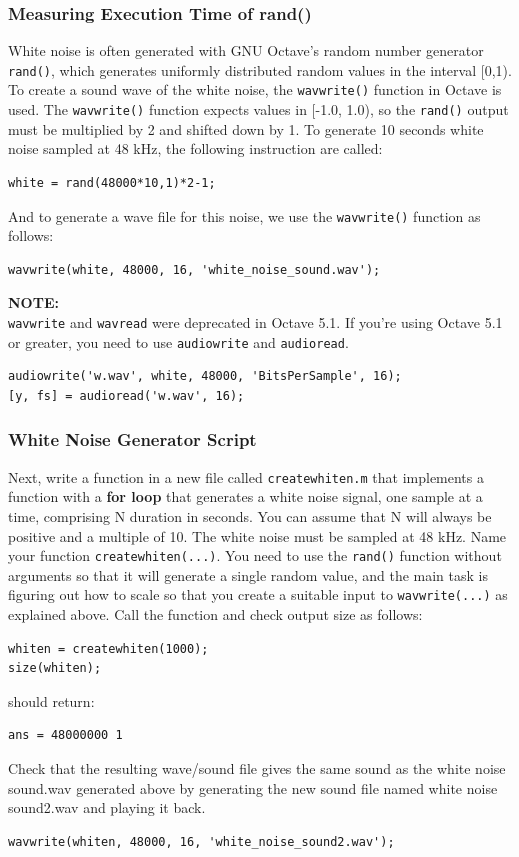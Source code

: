 \subsubsection{Measuring Execution Time of rand()}
White noise is often generated with GNU Octave’s random number generator \verb|rand()|, which generates uniformly distributed random values in the interval [0,1). To create a sound wave of the white noise, the \verb|wavwrite()| function in Octave is used. The \verb|wavwrite()| function expects values in [-1.0, 1.0), so the \verb|rand()| output must be multiplied by 2 and shifted down by 1. To generate 10 seconds white noise sampled at 48 kHz, the following instruction are called:
\begin{lstlisting}
white = rand(48000*10,1)*2-1;
\end{lstlisting}
And to generate a wave file for this noise, we use the \verb|wavwrite()| function as follows:
\begin{lstlisting}
wavwrite(white, 48000, 16, 'white_noise_sound.wav');
\end{lstlisting}

\textbf{NOTE:}\\
\verb|wavwrite| and \verb|wavread| were deprecated in Octave 5.1. If you're using Octave 5.1 or greater, you need to use \verb|audiowrite| and \verb|audioread|.
\begin{lstlisting}
audiowrite('w.wav', white, 48000, 'BitsPerSample', 16);
[y, fs] = audioread('w.wav', 16);
\end{lstlisting}

\subsubsection{White Noise Generator Script}
Next, write a function in a new file called \verb|createwhiten.m| that implements a function with a \textbf{for loop} that generates a white noise signal, one sample at a time, comprising N duration in seconds. You can assume that N will always be positive and a multiple of 10. The white noise must be sampled at 48 kHz. Name your function \verb|createwhiten(...)|. You need to use the \verb|rand()| function without arguments so that it will generate a single random value, and the main task is figuring out how to scale so that you create a suitable input to \verb|wavwrite(...)| as explained above. Call the function and check output size as follows:
\begin{lstlisting}
whiten = createwhiten(1000);
size(whiten);
\end{lstlisting}
should return:
\begin{lstlisting}
ans = 48000000 1
\end{lstlisting}
Check that the resulting wave/sound file gives the same sound as the white noise sound.wav generated above by generating the new sound file named white noise sound2.wav and playing it back.
\begin{lstlisting}
wavwrite(whiten, 48000, 16, 'white_noise_sound2.wav');
\end{lstlisting}


